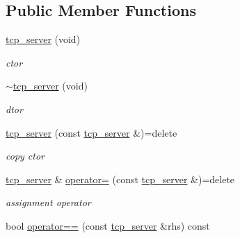 \subsection*{Public Member Functions}
\begin{DoxyCompactItemize}
\item 
\mbox{\label{classtacopie_1_1tcp__server_a4f67a38a0764924768cbcc7cf68527bf}} 
\hyperlink{classtacopie_1_1tcp__server_a4f67a38a0764924768cbcc7cf68527bf}{tcp\+\_\+server} (void)
\begin{DoxyCompactList}\small\item\em ctor \end{DoxyCompactList}\item 
\mbox{\label{classtacopie_1_1tcp__server_a7841dc528e2d3dfc94fbe9b93824da50}} 
\hyperlink{classtacopie_1_1tcp__server_a7841dc528e2d3dfc94fbe9b93824da50}{$\sim$tcp\+\_\+server} (void)
\begin{DoxyCompactList}\small\item\em dtor \end{DoxyCompactList}\item 
\mbox{\label{classtacopie_1_1tcp__server_a2d9c6a2dea95a3c6a919c655d6e8e0ba}} 
\hyperlink{classtacopie_1_1tcp__server_a2d9c6a2dea95a3c6a919c655d6e8e0ba}{tcp\+\_\+server} (const \hyperlink{classtacopie_1_1tcp__server}{tcp\+\_\+server} \&)=delete
\begin{DoxyCompactList}\small\item\em copy ctor \end{DoxyCompactList}\item 
\mbox{\label{classtacopie_1_1tcp__server_a7e7da4352e2e016f8d40d19bf9fee54b}} 
\hyperlink{classtacopie_1_1tcp__server}{tcp\+\_\+server} \& \hyperlink{classtacopie_1_1tcp__server_a7e7da4352e2e016f8d40d19bf9fee54b}{operator=} (const \hyperlink{classtacopie_1_1tcp__server}{tcp\+\_\+server} \&)=delete
\begin{DoxyCompactList}\small\item\em assignment operator \end{DoxyCompactList}\item 
bool \hyperlink{classtacopie_1_1tcp__server_ab9b95a27afb405668bb4d5b1a312ceae}{operator==} (const \hyperlink{classtacopie_1_1tcp__server}{tcp\+\_\+server} \&rhs) const

\end{DoxyCompactItemize}
